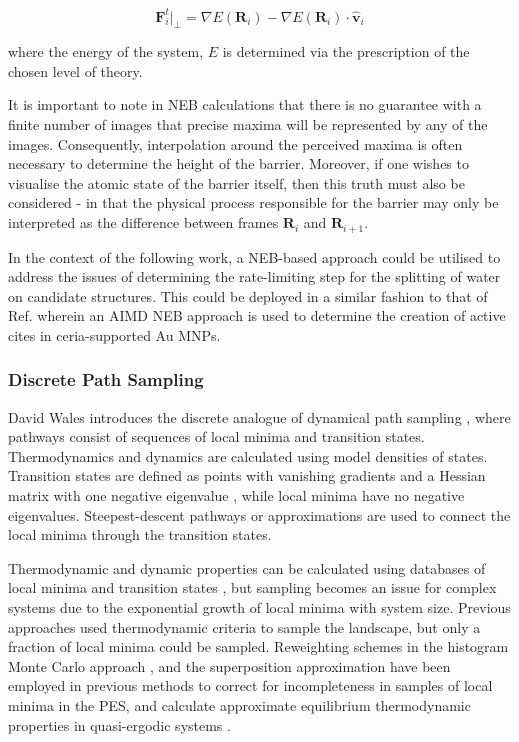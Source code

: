 \begin{equation}
    \textbf{F}_{i}^{t}|_{\perp} = \nabla E\left( \textbf{R}_{i} \right) - \nabla E\left( \textbf{R}_{i} \right) \cdot \hat{\textbf{v}}_{i}
    \label{neb:true}
\end{equation}

where the energy of the system, $E$ is determined via the prescription of the chosen level of theory.

It is important to note in NEB calculations that there is no guarantee with a finite number of images that precise maxima will be represented by any of the images. Consequently, interpolation around the perceived maxima is often necessary to determine the height of the barrier. Moreover, if one wishes to visualise the atomic state of the barrier itself, then this truth must also be considered - in that the physical process responsible for the barrier may only be interpreted as the difference between frames $\textbf{R}_{i}$ and $\textbf{R}_{i+1}$.

In the context of the following work, a NEB-based approach could be utilised to address the issues of determining the rate-limiting step for the splitting of water on candidate structures. This could be deployed in a similar fashion to that of Ref. \cite{Wang2015-qi} wherein an AIMD NEB approach is used to determine the creation of active cites in ceria-supported Au MNPs. 

\subsubsection{Discrete Path Sampling}
\label{sec:DPS}
David Wales introduces the discrete analogue of dynamical path sampling \cite{doi:10.1080/00268970210162691}, where pathways consist of sequences of local minima and transition states. Thermodynamics and dynamics are calculated using model densities of states. Transition states are defined as points with vanishing gradients and a Hessian matrix with one negative eigenvalue \cite{TF9686400371}, while local minima have no negative eigenvalues. Steepest-descent pathways or approximations are used to connect the local minima through the transition states.

Thermodynamic and dynamic properties can be calculated using databases of local minima and transition states \cite{10.1063/1.1484389}, but sampling becomes an issue for complex systems due to the exponential growth of local minima with system size. Previous approaches used thermodynamic criteria to sample the landscape, but only a fraction of local minima could be sampled. Reweighting schemes in the histogram Monte Carlo approach \cite{PhysRevLett.61.2635}, and the superposition approximation \cite{10.1063/1.1484389} have been employed in previous methods to correct for incompleteness in samples of local minima in the PES, and calculate approximate equilibrium thermodynamic properties in quasi-ergodic systems \cite{PhysRevLett.80.1357}.


